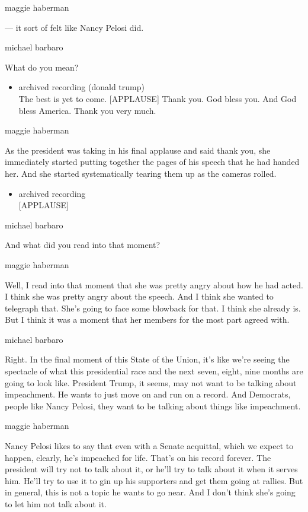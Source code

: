 maggie haberman

--- it sort of felt like Nancy Pelosi did.

michael barbaro

What do you mean?

\begin{itemize}
\tightlist
\item
  archived recording (donald trump)\\
  The best is yet to come. {[}APPLAUSE{]} Thank you. God bless you. And
  God bless America. Thank you very much.
\end{itemize}

maggie haberman

As the president was taking in his final applause and said thank you,
she immediately started putting together the pages of his speech that he
had handed her. And she started systematically tearing them up as the
cameras rolled.

\begin{itemize}
\tightlist
\item
  archived recording\\
  {[}APPLAUSE{]}
\end{itemize}

michael barbaro

And what did you read into that moment?

maggie haberman

Well, I read into that moment that she was pretty angry about how he had
acted. I think she was pretty angry about the speech. And I think she
wanted to telegraph that. She's going to face some blowback for that. I
think she already is. But I think it was a moment that her members for
the most part agreed with.

michael barbaro

Right. In the final moment of this State of the Union, it's like we're
seeing the spectacle of what this presidential race and the next seven,
eight, nine months are going to look like. President Trump, it seems,
may not want to be talking about impeachment. He wants to just move on
and run on a record. And Democrats, people like Nancy Pelosi, they want
to be talking about things like impeachment.

maggie haberman

Nancy Pelosi likes to say that even with a Senate acquittal, which we
expect to happen, clearly, he's impeached for life. That's on his record
forever. The president will try not to talk about it, or he'll try to
talk about it when it serves him. He'll try to use it to gin up his
supporters and get them going at rallies. But in general, this is not a
topic he wants to go near. And I don't think she's going to let him not
talk about it.

